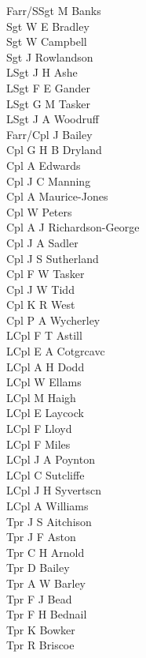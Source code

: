 \begin{multicols}{2}
  \noindent
  Farr/SSgt M Banks \\
  Sgt W E Bradley \\
  Sgt W Campbell \\
  Sgt J Rowlandson \\
  LSgt J H Ashe \\
  LSgt F E Gander \\
  LSgt G M Tasker \\
  LSgt J A Woodruff \\
  Farr/Cpl J Bailey \\
  Cpl G H B Dryland \\
  Cpl A Edwards \\
  Cpl J C Manning \\
  Cpl A Maurice-Jones \\
  Cpl W Peters \\
  Cpl A J Richardson-George \\
  Cpl J A Sadler \\
  Cpl J S Sutherland \\
  Cpl F W Tasker \\
  Cpl J W Tidd \\
  Cpl K R West \\
  Cpl P A Wycherley \\
  LCpl F T Astill \\
  LCpl E A Cotgrcavc \\
  LCpl A H Dodd \\
  LCpl W Ellams \\
  LCpl M Haigh \\
  LCpl E Laycock \\
  LCpl F Lloyd \\
  LCpl F Miles \\
  LCpl J A Poynton \\
  LCpl C Sutcliffe \\
  LCpl J H Syvertscn \\
  LCpl A Williams \\
  Tpr J S Aitchison \\
  Tpr J F Aston \\
  Tpr C H Arnold \\
  Tpr D Bailey \\
  Tpr A W Barley \\
  Tpr F J Bead \\
  Tpr F H Bednail \\
  Tpr K Bowker \\
  Tpr R Briscoe \\

\end{multicols}

